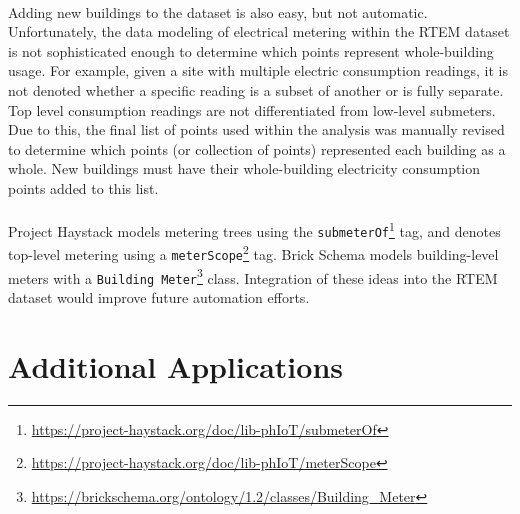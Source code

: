 \documentclass[a4paper]{article}
\begin{document}
\paragraph{}
Adding new buildings to the dataset is also easy, but not automatic. Unfortunately, the data modeling of electrical metering within the RTEM dataset is not sophisticated enough to determine which points represent whole-building usage. For example, given a site with multiple electric consumption readings, it is not denoted whether a specific reading is a subset of another or is fully separate. Top level consumption readings are not differentiated from low-level submeters. Due to this, the final list of points used within the analysis was manually revised to determine which points (or collection of points) represented each building as a whole. New buildings must have their whole-building electricity consumption points added to this list.

\paragraph{}
Project Haystack models metering trees using the \texttt{submeterOf}\footnote{\url{https://project-haystack.org/doc/lib-phIoT/submeterOf}} tag, and denotes top-level metering using a \texttt{meterScope}\footnote{\url{https://project-haystack.org/doc/lib-phIoT/meterScope}} tag. Brick Schema models building-level meters with a \texttt{Building Meter}\footnote{\url{https://brickschema.org/ontology/1.2/classes/Building\_Meter}} class. Integration of these ideas into the RTEM dataset would improve future automation efforts.

\section{Additional Applications}
\end{document}
